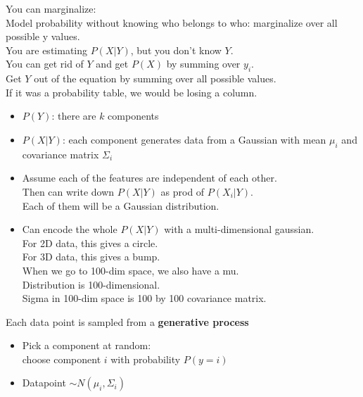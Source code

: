 You can marginalize: \hfill \\
Model probability without knowing who belongs to who: marginalize over all possible y values.   \hfill \\
You are estimating $P(X|Y)$, but you don't know $Y$.   \hfill \\
You can get rid of $Y$ and get $P(X)$ by summing over $y_i$.  \hfill \\
Get $Y$ out of the equation by summing over all possible values. \hfill \\
If it was a probability table, we would be losing a column. \hfill \\


\begin{itemize}
	\item $P(Y)$: there are $k$ components
	\item $P(X | Y)$: each component generates data from a Gaussian with mean $\mu_i$ and covariance matrix $\Sigma_i$
	\item Assume each of the features are independent of each other. \hfill \\ %
		Then can write down $P(X|Y)$ as prod of $P(X_i | Y)$.  \hfill \\ %
        		Each of them will be a Gaussian distribution. \hfill \\  %
	\item  Can encode the whole $P(X|Y)$ with a multi-dimensional gaussian. \hfill \\  %
		For 2D data, this gives a circle.  \hfill \\  %
		For 3D data, this gives a bump.  \hfill \\  %
		 When we go to 100-dim space, we also have a mu.   \hfill \\  %
		 	Distribution is 100-dimensional. \hfill \\  %
			Sigma in 100-dim space is 100 by 100 covariance matrix. \hfill \\  %
\end{itemize}

Each data point is sampled from a \textbf{generative process}
\begin{itemize}
	\item Pick a component at random: \hfill \\
		choose component $i$ with probability $P(y=i)$
	\item Datapoint $\sim N(\mu_i, \Sigma_i)$
\end{itemize}

